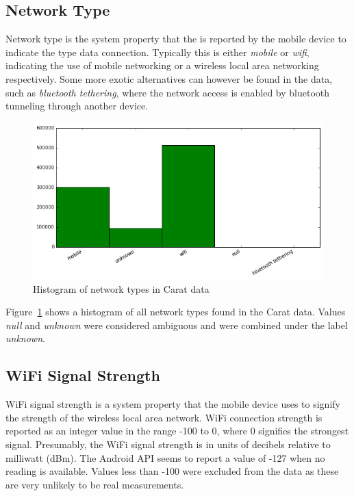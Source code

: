 \subsection{Network Type}  

Network type is the system property that the is reported by the mobile device to indicate the type data connection. Typically this is either \textit{mobile} or \textit{wifi}, indicating the use of mobile networking or a wireless local area networking respectively. Some more exotic alternatives can however be found in the data, such as \textit{bluetooth tethering}, where the network access is enabled by bluetooth tunneling through another device.

\begin{figure}[!htbp]
	\centering
	\includegraphics[width=\textwidth]{images/carat-data/network_type.png}
	\caption{Histogram of network types in Carat data}
	\label{figure:carat-data-net-type}
\end{figure}   

Figure~\ref{figure:carat-data-net-type} shows a histogram of all network types found in the Carat data. Values \textit{null} and \textit{unknown} were considered ambiguous and were combined under the label \textit{unknown}.
 

\subsection{WiFi Signal Strength}

WiFi signal strength is a system property that the mobile device uses to signify the strength of the wireless local area network. WiFi connection strength is reported as an integer value in the range -100 to 0, where 0 signifies the strongest signal. Presumably, the WiFi signal strength is in units of decibels relative to milliwatt (dBm). The Android API seems to report a value of -127 when no reading is available. Values less than -100 were excluded from the data as these are very unlikely to be real measurements.

